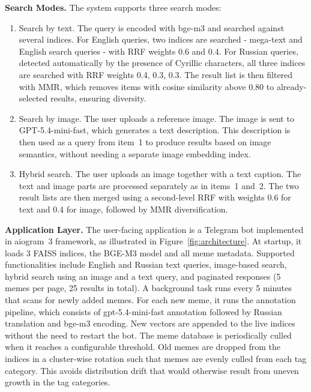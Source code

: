 \documentclass[a4paper,12pt]{article}
\begin{document}
\textbf{Search Modes.} The system supports three search modes:

\begin{enumerate}
    \item Search by text. The query is encoded with bge-m3 and searched against several indices. For English queries, two indices are searched - mega-text and English search queries - with RRF weights 0.6 and 0.4. For Russian queries, detected automatically by the presence of Cyrillic characters, all three indices are searched with RRF weights 0.4, 0.3, 0.3. The result list is then filtered with MMR, which removes items with cosine similarity above 0.80 to already-selected results, ensuring diversity.

    \item Search by image. The user uploads a reference image. The image is sent to GPT-5.4-mini-fast, which generates a text description. This description is then used as a query from item~1 to produce results based on image semantics, without needing a separate image embedding index.

    \item Hybrid search. The user uploads an image together with a text caption. The text and image parts are processed separately as in items~1 and~2. The two result lists are then merged using a second-level RRF with weights 0.6 for text and 0.4 for image, followed by MMR diversification.
\end{enumerate}

\textbf{Application Layer.} The user-facing application is a Telegram bot implemented in aiogram~3 framework, as illustrated in Figure~\ref{fig:architecture}. At startup, it loads 3 FAISS indices, the BGE-M3 model and all meme metadata. Supported functionalities include English and Russian text queries, image-based search, hybrid search using an image and a text query, and paginated responses (5 memes per page, 25 results in total). A background task runs every 5 minutes that scans for newly added memes. For each new meme, it runs the annotation pipeline, which consists of gpt-5.4-mini-fast annotation followed by Russian translation and bge-m3 encoding. New vectors are appended to the live indices without the need to restart the bot. The meme database is periodically culled when it reaches a configurable threshold. Old memes are dropped from the indices in a cluster-wise rotation such that memes are evenly culled from each tag category. This avoids distribution drift that would otherwise result from uneven growth in the tag categories.
\end{document}
